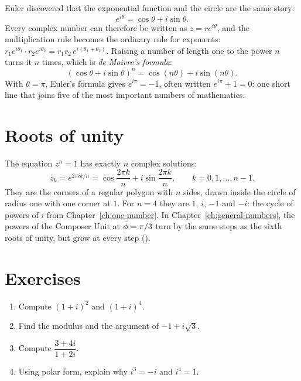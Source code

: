 Euler discovered that the exponential function and the circle are the same story:
\[
e^{i\theta} = \cos\theta + i\sin\theta .
\]
Every complex number can therefore be written as $z = re^{i\theta}$, and the multiplication rule becomes the ordinary rule for exponents: $r_1e^{i\theta_1} \cdot r_2e^{i\theta_2} = r_1r_2\,e^{i(\theta_1 + \theta_2)}$. Raising a number of length one to the power $n$ turns it $n$ times, which is \emph{de Moivre's formula}:
\[
(\cos\theta + i\sin\theta)^n = \cos(n\theta) + i\sin(n\theta) .
\]
With $\theta = \pi$, Euler's formula gives $e^{i\pi} = -1$, often written $e^{i\pi} + 1 = 0$: one short line that joins five of the most important numbers of mathematics.

\section{Roots of unity}\label{app:c-roots}

The equation $z^n = 1$ has exactly $n$ complex solutions:
\[
z_k = e^{2\pi i k/n} = \cos\frac{2\pi k}{n} + i\sin\frac{2\pi k}{n}, \qquad k = 0, 1, \dots, n - 1 .
\]
They are the corners of a regular polygon with $n$ sides, drawn inside the circle of radius one with one corner at $1$. For $n = 4$ they are $1$, $i$, $-1$ and $-i$: the cycle of powers of $i$ from Chapter~\ref{ch:one-number}. In Chapter~\ref{ch:general-numbers}, the powers of the Composer Unit at $\bar{\phi} = \pi/3$ turn by the same steps as the sixth roots of unity, but grow at every step ().

\section{Exercises}\label{app:c-exercises}

\begin{enumerate}
  \item Compute $(1 + i)^2$ and $(1 + i)^4$.
  \item Find the modulus and the argument of $-1 + i\sqrt{3}$.
  \item Compute $\dfrac{3 + 4i}{1 + 2i}$.
  \item Using polar form, explain why $i^3 = -i$ and $i^4 = 1$.
\end{enumerate}

